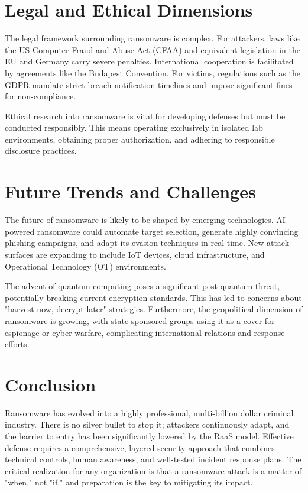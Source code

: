 \documentclass[12pt,a4paper]{article}
\begin{document}
\section{Legal and Ethical Dimensions}
The legal framework surrounding ransomware is complex. For attackers, laws like the US Computer Fraud and Abuse Act (CFAA) and equivalent legislation in the EU and Germany carry severe penalties. International cooperation is facilitated by agreements like the Budapest Convention. For victims, regulations such as the GDPR mandate strict breach notification timelines and impose significant fines for non-compliance.

Ethical research into ransomware is vital for developing defenses but must be conducted responsibly. This means operating exclusively in isolated lab environments, obtaining proper authorization, and adhering to responsible disclosure practices.

\section{Future Trends and Challenges}
The future of ransomware is likely to be shaped by emerging technologies. AI-powered ransomware could automate target selection, generate highly convincing phishing campaigns, and adapt its evasion techniques in real-time. New attack surfaces are expanding to include IoT devices, cloud infrastructure, and Operational Technology (OT) environments.

The advent of quantum computing poses a significant post-quantum threat, potentially breaking current encryption standards. This has led to concerns about "harvest now, decrypt later" strategies. Furthermore, the geopolitical dimension of ransomware is growing, with state-sponsored groups using it as a cover for espionage or cyber warfare, complicating international relations and response efforts.

\section{Conclusion}
Ransomware has evolved into a highly professional, multi-billion dollar criminal industry. There is no silver bullet to stop it; attackers continuously adapt, and the barrier to entry has been significantly lowered by the RaaS model. Effective defense requires a comprehensive, layered security approach that combines technical controls, human awareness, and well-tested incident response plans. The critical realization for any organization is that a ransomware attack is a matter of "when," not "if," and preparation is the key to mitigating its impact.
\end{document}

